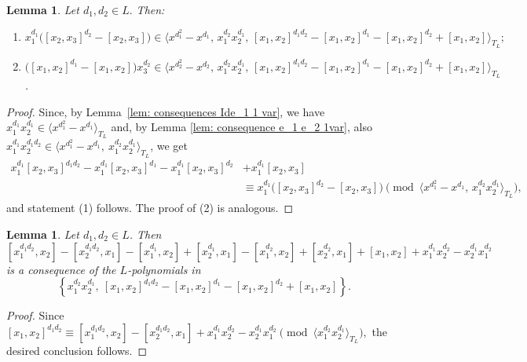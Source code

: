 \documentclass[a4paper,reqno]{amsart}
\newtheorem{lemma}[theorem]{Lemma}
\theoremstyle{definition}
\numberwithin{equation}{section}
\numberwithin{theorem}{section}
\begin{document}
\begin{lemma}\label{lem: UT_3^e1,e2 d1 e d2 ordin}
       Let $d_1,d_2\in L.$
Then:
\begin{enumerate}
    \item $x_1^{d_1}\big([x_2,x_3]^{d_2}-[x_2,x_3]\big) \in \langle x^{d_1^2}-x^{d_1},\, x_1^{d_2}x_2^{d_1},\,  [x_1,x_2]^{d_1 d_2}- [x_1,x_2]^{d_1} - [x_1,x_2]^{d_2}+ [x_1,x_2]\rangle_{T_L};$
    \vspace{1mm}
    \item $\big([x_1,x_2]^{d_1}-[x_1,x_2]\big)x_3^{d_2} \in \langle x^{d_2^2}-x^{d_2},\, x_1^{d_2}x_2^{d_1}, \, [x_1,x_2]^{d_1 d_2}-[x_1,x_2]^{d_1} - [x_1,x_2]^{d_2}+[x_1,x_2] \rangle_{T_L}$.
\end{enumerate}
\end{lemma}
\begin{proof}
     Since, by Lemma~\ref{lem: consequences Ide_1 1 var}, we have $x_1^{d_1}x_2^{d_1}\in \langle x^{d_1^2}-x^{d_1} \rangle_{T_L} $ and, by Lemma \ref{lem: consequence e_1 e_2 1var}, also $x_1^{d_1} x_2^{d_1 d_2} \in \langle x^{d_1^2}-x^{d_1},\ x_1^{d_2}x_2^{d_1}\rangle_{T_L}$, we get
     \begin{align*}
         x_1^{d_1}[x_2,x_3]^{d_1 d_2}- x_1^{d_1}[x_2,x_3]^{d_1} - x_1^{d_1} [x_2,x_3]^{d_2}& + x_1^{d_1} [x_2,x_3]\\
         &\equiv x_1^{d_1}\big([x_2,x_3]^{d_2}-[x_2,x_3]\big) \pmod{\langle x^{d_1^2}-x^{d_1},\, x_1^{d_2}x_2^{d_1}\rangle_{T_L}},
     \end{align*}
     and statement (1) follows. The proof of (2) is analogous.
\end{proof}


\begin{lemma}\label{lem: UT_3^e1,e2 d1d2 ordin}
    Let $d_1,d_2\in L$. Then
     $$[x_1^{d_1 d_2},x_2]-  [x_2^{d_1 d_2},x_1]
    -[x_1^{d_1},x_2] +[x_2^{d_1},x_1]  - [x_1^{d_2},x_2]  + [x_2^{d_2},x_1]+ [x_1,x_2] + x_1^{d_1}x_2^{d_2} - x_2^{d_1}x_1^{d_2}$$
    is a consequence of the $L$-polynomials in
    $$
    \left\{ x_1^{d_2}x_2^{d_1}, \  [x_1,x_2]^{d_1 d_2}-[x_1,x_2]^{d_1} -[x_1,x_2]^{d_2} + [x_1,x_2]\right\}.
    $$
\end{lemma}
\begin{proof}
   Since
    $[x_1,x_2]^{d_1 d_2}\equiv  [x_1^{d_1 d_2},x_2]- [x_2^{d_1 d_2},x_1]+ x_1^{d_1}x_2^{d_2} - x_2^{d_1}x_1^{d_2} \pmod{\langle x_1^{d_2}x_2^{d_1} \rangle_{T_L}},$ the desired conclusion follows.
\end{proof}
\end{document}
